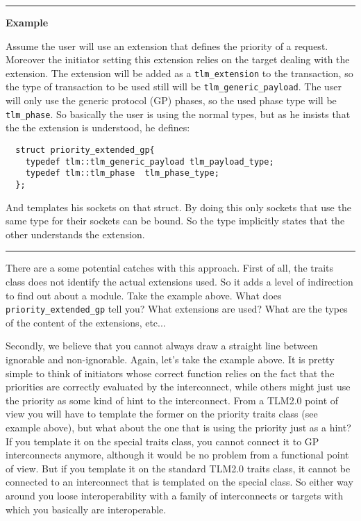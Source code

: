 \documentclass[a4paper,10pt]{article}          %
\begin{document}
\medskip
\hrule
\medskip

\noindent
\textbf{Example}

Assume the user will use an extension that defines the priority of a request. Moreover the initiator setting this extension relies on the target dealing with the extension. The extension will be added as a \verb|tlm_extension| to the transaction, so the type of transaction to be used still will be \verb|tlm_generic_payload|. The user will only use the generic protocol (GP) phases, so the used phase type will be \verb|tlm_phase|. So basically the user is using the normal types, but as he insists that the the extension is understood, he defines:

\begin{verbatim}
  struct priority_extended_gp{
    typedef tlm::tlm_generic_payload tlm_payload_type;
    typedef tlm::tlm_phase  tlm_phase_type;
  };
\end{verbatim}

And templates his sockets on that struct. By doing this only sockets that use the same type for their sockets can be bound. So the type implicitly states that the other understands the extension.

\medskip
\hrule
\medskip

There are a some potential catches with this approach. First of all, the traits class does not identify the actual extensions used. So it adds a level of indirection to find out about a module. Take the example above. What does  \verb|priority_extended_gp| tell you? What extensions are used? What are the types of the content of the extensions, etc...

Secondly, we believe that you cannot always draw a straight line between ignorable and non-ignorable.  Again, let's take the example above. It is pretty simple to think of initiators whose correct function relies on the fact that the priorities are correctly evaluated by the interconnect, while others might just use the priority as some kind of hint to the interconnect. From a TLM2.0 point of view you will have to template the former on the priority traits class (see example above), but what about the one that is using the priority just as a hint? If you template it on the special traits class, you cannot connect it to GP interconnects anymore, although it would be no problem from a functional point of view. But if you template it on the standard TLM2.0 traits class, it cannot be connected to an interconnect that is templated on the special class. So either way around you loose interoperability with a family of interconnects or targets with which you basically are interoperable.
\end{document}
